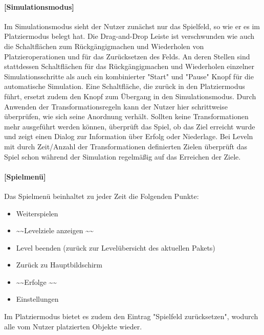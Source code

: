 \paragraph{{[}Simulationsmodus{]}}
Im Simulationsmodus sieht der Nutzer zunächst nur das Spielfeld, so wie
er es im Platziermodus belegt hat. Die Drag-and-Drop Leiste ist verschwunden
wie auch die Schaltflächen zum Rückgängigmachen und Wiederholen von 
Platzieroperationen und für das Zurücksetzen des Felds. An deren Stellen 
sind stattdessen Schaltflächen für das Rückgängigmachen und Wiederholen 
einzelner Simulationsschritte als auch ein kombinierter
"Start" und "Pause" Knopf für die automatische Simulation. Eine Schaltfläche,
die zurück in den Platziermodus führt, ersetzt zudem den Knopf zum Übergang 
in den Simulationsmodus.
\newline
Durch Anwenden der Transformationsregeln kann der Nutzer hier schrittweise
überprüfen, wie sich seine Anordnung verhält. Sollten keine Transformationen
mehr ausgeführt werden können, überprüft das Spiel, ob das Ziel erreicht
wurde und zeigt einen Dialog zur Information über Erfolg oder Niederlage.
Bei Leveln mit durch Zeit/Anzahl der Transformationen definierten Zielen
überprüft das Spiel schon während der Simulation regelmäßig auf das Erreichen
der Ziele.
\newline
\newline
\paragraph{{[}Spielmenü{]}}
Das Spielmenü beinhaltet zu jeder Zeit die Folgenden Punkte:
\begin{itemize}
	\item Weiterspielen
	\item \textasciitilde\textasciitilde Levelziele anzeigen \textasciitilde\textasciitilde
	\item Level beenden (zurück zur Levelübersicht des aktuellen Pakets)
	\item Zurück zu Hauptbildschirm
	\item \textasciitilde\textasciitilde Erfolge \textasciitilde\textasciitilde
	\item Einstellungen
\end{itemize}
Im Platziermodus bietet es zudem den Eintrag "Spielfeld zurücksetzen",
wodurch alle vom Nutzer platzierten Objekte wieder.
